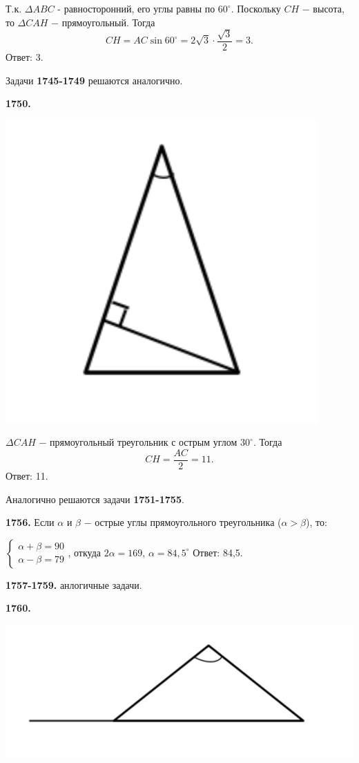 Т.к. $\Delta ABC$ - равносторонний, его углы равны по $60^\circ$. Поскольку $CH$ $-$ высота, то $\Delta CAH$ $-$ прямоугольный. Тогда 
\[
CH = AC \sin{60^\circ} = 2\sqrt{3}\cdot\frac{\sqrt{3}}{2} = 3.
\] \null \hspace*{\fill} Ответ: 3.

Задачи \textbf{1745-1749} решаются аналогично.

\textbf{1750.}

{\centering \includegraphics[width=0.4\linewidth]{Geometry/Content/4.png}
	
}

$\Delta CAH$ $-$  прямоугольный треугольник с острым углом $30^\circ$. Тогда
\[
CH = \frac{AC}{2} = 11.
\]\null \hspace*{\fill} Ответ: 11.

Аналогично решаются задачи \textbf{1751-1755}.

\textbf{1756.} Если $\alpha$ и $\beta$ $-$ острые углы прямоугольного треугольника ($\alpha > \beta$), то:

{\centering $
\begin{cases}
	\alpha + \beta = 90 \\
	\alpha - \beta = 79
\end{cases}
$, откуда $2\alpha = 169$, $\alpha = 84,5^\circ$ \newline \null \hspace*{\fill} Ответ: 84,5.

}

\textbf{1757-1759.} анлогичные задачи.

\textbf{1760.}

{\centering \includegraphics[width=0.6\linewidth]{Geometry/Content/5.png}

}

